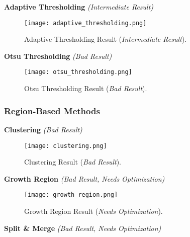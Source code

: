 \documentclass[12pt,a4paper]{article}
\begin{document}
\newpage %

\vspace{0.5em} %
 \textbf{Adaptive Thresholding} \textit{(Intermediate Result)}

\begin{figure}[h!]
    \centering
    \texttt{[image: adaptive\_thresholding.png]}
    \caption{Adaptive Thresholding Result (\textit{Intermediate Result}).}
    \label{fig:adaptive_thresholding}
\end{figure}

\vspace{0.5em} %
 \textbf{Otsu Thresholding} \textit{(Bad Result)}

\begin{figure}[h!]
    \centering
    \texttt{[image: otsu\_thresholding.png]}
    \caption{Otsu Thresholding Result (\textit{Bad Result}).}
    \label{fig:otsu_thresholding}
\end{figure}

\newpage %

\subsubsection*{Region-Based Methods}

\vspace{0.5em} %
\hspace{1em}\textbf{Clustering} \textit{(Bad Result)}

\begin{figure}[h!]
    \centering
    \texttt{[image: clustering.png]}
    \caption{Clustering Result (\textit{Bad Result}).}
    \label{fig:clustering}
\end{figure}

\vspace{0.5em} %
\textbf{Growth Region} \textit{(Bad Result, Needs Optimization)}

\begin{figure}[h!]
    \centering
    \texttt{[image: growth\_region.png]}
    \caption{Growth Region Result (\textit{Needs Optimization}).}
    \label{fig:growth_region}
\end{figure}

\vspace{0.5em} %
\textbf{Split \& Merge} \textit{(Bad Result, Needs Optimization)}
\end{document}
